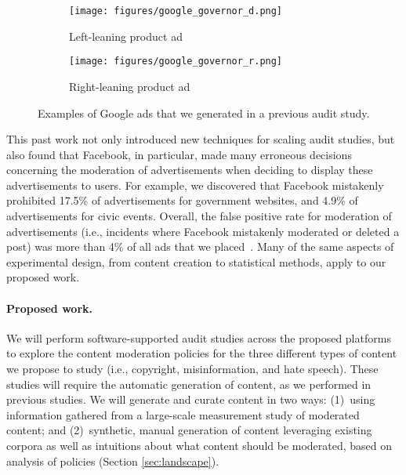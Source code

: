 \begin{figure*}[h!]
  \centering
  \begin{subfigure}[b]{0.3\textwidth}
    \texttt{[image: figures/google\_governor\_d.png]}
    \caption{Left-leaning product ad}
    \label{fig:google_ad_1}
  \end{subfigure}
  \begin{subfigure}[b]{0.3\textwidth}
    \texttt{[image: figures/google\_governor\_r.png]}
    \caption{Right-leaning product ad}
    \label{fig:google_ad_2}
  \end{subfigure}
    \caption{Examples of Google ads that we generated in a previous audit study.}
  \label{fig:google_ad_examples}
\end{figure*}
\fi

This past work not only introduced new techniques for scaling audit studies,
but also found that Facebook, in particular, made many erroneous decisions
concerning the moderation of advertisements when deciding to display these
advertisements to users. For example, we discovered that
Facebook mistakenly prohibited 17.5\% of advertisements for government
websites, and 4.9\% of advertisements for civic events. Overall, the false
positive rate for moderation of advertisements (i.e., incidents where Facebook
mistakenly moderated or deleted a post) was more than 4\% of all ads that we
placed~\cite{hounsel2021software}.  Many of the same aspects of
experimental design, from content creation to statistical methods, apply to
our proposed work.

\paragraph{Proposed work.} We will perform software-supported audit studies
across the proposed platforms to explore the content moderation policies for
the three different types of content we propose to study (i.e., copyright,
misinformation, and hate speech).  These studies will require the automatic
generation of content, as we performed in previous studies. We will generate
and curate content in two ways: (1)~using information gathered from a
large-scale measurement study of moderated content; and (2)~synthetic, manual
generation of content leveraging existing corpora as well as intuitions about
what content should be moderated, based on analysis of policies (Section
\ref{sec:landscape}). 

